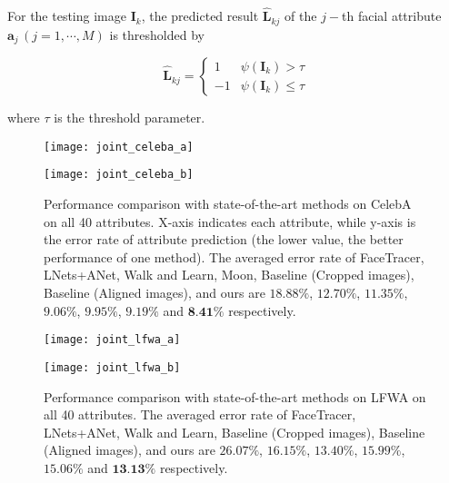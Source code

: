 \documentclass[10pt,twocolumn,letterpaper]{article}
\begin{document}
For the testing image $\mathbf{I}_{k}$, the predicted result $\hat{\mathbf{L}}_{kj}$
of the $j-$th facial attribute $\mathbf{a}_{j}\,(j=1,\cdots,M)$
is thresholded by

\begin{equation}
\hat{\mathbf{L}}_{kj}=\begin{cases}
1 & \psi\left(\mathbf{I}_{k}\right)>\tau\\
-1 & \psi\left(\mathbf{I}_{k}\right)\leq\tau
\end{cases}\label{eq:threshold}
\end{equation}

\noindent where $\tau$ is the threshold parameter.

\begin{figure*}
\begin{centering}
\texttt{[image: joint\_celeba\_a]} 
\par\end{centering}
\begin{centering}
\texttt{[image: joint\_celeba\_b]} 
\par\end{centering}
\caption{Performance comparison with state-of-the-art methods on CelebA on
all 40 attributes. X-axis indicates each attribute, while y-axis is
the error rate of attribute prediction (the lower value, the better
performance of one method). The averaged error rate of FaceTracer,
LNets+ANet, Walk and Learn, Moon, Baseline (Cropped images), Baseline
(Aligned images), and ours are $18.88\%$, $12.70\%$, $11.35\%$,
$9.06\%$, $9.95\%$, $9.19\%$ and $\textbf{8.41\%}$ respectively.
\label{fig:celebA-Performance-comparison-with}}
\end{figure*}

\begin{figure*}
\begin{centering}
\texttt{[image: joint\_lfwa\_a]} 
\par\end{centering}
\begin{centering}
\texttt{[image: joint\_lfwa\_b]} 
\par\end{centering}
\caption{Performance comparison with state-of-the-art methods on LFWA on all
40 attributes. The averaged error rate of FaceTracer, LNets+ANet, Walk
and Learn, Baseline (Cropped images), Baseline (Aligned images), and
ours are $26.07\%$, $16.15\%$, $13.40\%$, $15.99\%$, $15.06\%$
and  $\textbf{13.13\%}$ respectively. \label{fig:Performance-comparison-lfwa}}
\end{figure*}
\end{document}
